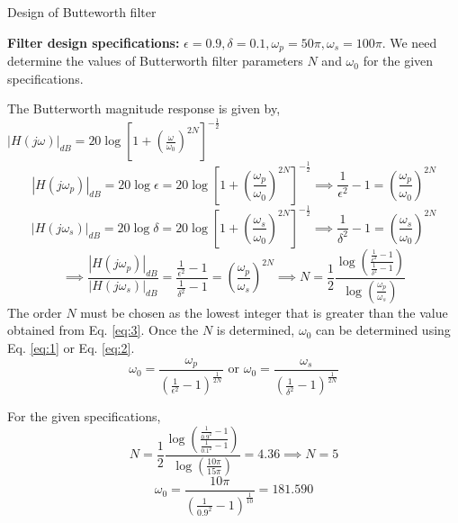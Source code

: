 \documentclass{beamer}
\begin{document}
\begin{frame}{Design of Butteworth filter}
\begin{tiny}
\textbf{Filter design specifications:} $\epsilon=0.9, \delta = 0.1, \omega_p = 50\pi, \omega_s = 100\pi$. We need determine the values of Butterworth filter parameters $N$ and $\omega_0$ for the given specifications.

The Butterworth magnitude response is given by, $\left|H(j\omega)\right|_{dB} = 20\log \left[1 + \left(\frac{\omega}{\omega_0}\right)^{2N}\right]^{-\frac{1}{2}} $
\vspace{-3mm}
\begin{equation}
\left|H(j\omega_p)\right|_{dB} = 20\log \epsilon = 20\log \left[1 + \left(\frac{\omega_p}{\omega_0}\right)^{2N}\right]^{-\frac{1}{2}} \implies \frac{1}{\epsilon^2} - 1 = \left(\frac{\omega_p}{\omega_0}\right)^{2N}
\label{eq:1}
\end{equation}
\vspace{-3mm}
\begin{equation}
\left|H(j\omega_s)\right|_{dB} = 20\log \delta = 20\log \left[1 + \left(\frac{\omega_s}{\omega_0}\right)^{2N}\right]^{-\frac{1}{2}} \implies \frac{1}{\delta^2} - 1 = \left(\frac{\omega_s}{\omega_0}\right)^{2N}
\label{eq:2}
\end{equation}
\vspace{-2mm}
\begin{equation}
\implies \frac{\left|H(j\omega_p)\right|_{dB}}{\left|H(j\omega_s)\right|_{dB}} = \frac{\frac{1}{\epsilon^2} - 1}{\frac{1}{\delta^2} - 1} = \left(\frac{\omega_p}{\omega_s}\right)^{2N} \implies N = \frac{1}{2}\frac{\log \left(\frac{\frac{1}{\epsilon^2} - 1}{\frac{1}{\delta^2} - 1}\right)}{\log \left(\frac{\omega_p}{\omega_s}\right)}
\label{eq:3}
\end{equation}
The order $N$ must be chosen as the lowest integer that is greater than the value obtained from Eq. \ref{eq:3}. Once the $N$ is determined, $\omega_0$ can be determined using Eq. \ref{eq:1} or Eq. \ref{eq:2}.
\[ \omega_0 = \frac{\omega_p}{\left(\frac{1}{\epsilon^2} - 1\right)^\frac{1}{2N}} \text{ or } \omega_0 = \frac{\omega_s}{\left(\frac{1}{\delta^2} - 1\right)^\frac{1}{2N}} \]

For the given specifications, 
\[ N = \frac{1}{2}\frac{\log \left(\frac{\frac{1}{0.9^2} - 1}{\frac{1}{0.1^2} - 1}\right)}{\log \left(\frac{10\pi}{15\pi}\right)} = 4.36 \implies N = 5\]
\[ \omega_0 = \frac{10\pi}{\left(\frac{1}{0.9^2}-1\right)^{\frac{1}{10}}} = 181.590 \]
\end{tiny}
\end{frame}
\end{document}
